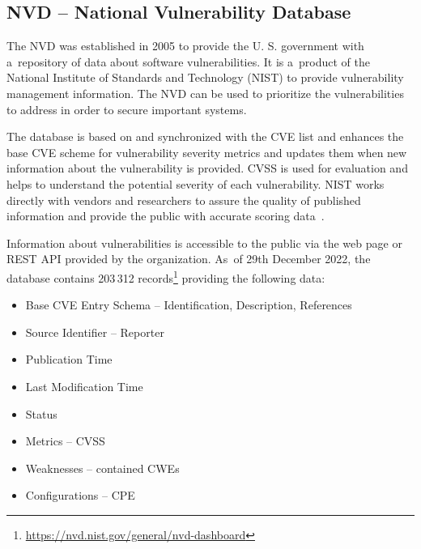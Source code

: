   \subsection*{NVD -- National Vulnerability Database}
  \label{section:nvd}
  The NVD was established in 2005 to provide the U. S. government with a~repository of data about software
  vulnerabilities. It is a~product of the National Institute of Standards and Technology (NIST) to provide
  vulnerability management information. The NVD can be used to prioritize the vulnerabilities to address
  in order to secure important systems.

  The database is based on and synchronized with the CVE list and enhances the base CVE scheme for vulnerability
  severity metrics and updates them when new information about the vulnerability is provided. CVSS is used
  for evaluation and helps to understand the potential severity of each vulnerability. NIST works directly
  with vendors and researchers to assure the quality of published information and provide the public with accurate
  scoring data~\cite{NVD}.

  Information about vulnerabilities is accessible to the public via the web page or REST API provided
  by the organization. As~of 29th December 2022, the database contains 203\,312
  records\footnote{\href{https://nvd.nist.gov/general/nvd-dashboard}{https://nvd.nist.gov/general/nvd-dashboard}}
  providing the following data:
  \begin{itemize}
      \item Base CVE Entry Schema -- Identification, Description, References
      \item Source Identifier -- Reporter
      \item Publication Time
      \item Last Modification Time
      \item Status
      \item Metrics -- CVSS
      \item Weaknesses -- contained CWEs
      \item Configurations -- CPE
  \end{itemize}

